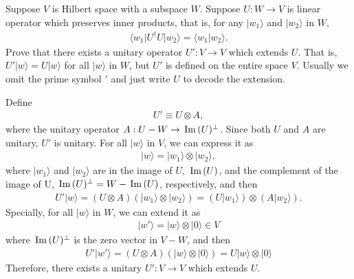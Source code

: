 \documentclass[en]{sol-man}
\begin{document}
\begin{exe}
    Suppose $V$ is Hilbert space with a subspace $W$. Suppose $U:W\rightarrow V$ is linear operator which preserves inner products, that is, for any $\lvert w_1\rangle$ and $\lvert w_2\rangle$ in $W$,
    \begin{align}
        \langle w_1\rvert U^{\dagger}U\lvert w_2\rangle=\langle w_1\vert w_2\rangle.
    \end{align}
    Prove that there exists a unitary operator $U':V\rightarrow V$ which extends $U$. That is, $U'\lvert w\rangle=U\lvert w\rangle$ for all $\lvert w\rangle$ in $W$, but $U'$ is defined on the entire space $V$. Usually we omit the prime symbol $'$ and just write $U$ to decode the extension.
\end{exe}
\begin{pf}
    Define
    \begin{align}
        U'\equiv U\otimes A,
    \end{align}
    where the unitary operator $A:U-W\rightarrow\,\mathrm{Im}\,(U)^{\perp}$.
    Since both $U$ and $A$ are unitary, $U'$ is unitary.
    For all $\lvert w\rangle$ in $V$, we can express it as
    \begin{align}
        \lvert w\rangle=\lvert w_1\rangle\otimes\lvert w_2\rangle,
    \end{align}
    where $\lvert w_1\rangle$ and $\lvert w_2\rangle$ are in the image of $U$, $\,\mathrm{Im}\,(U)$, and the complement of the image of U, $\,\mathrm{Im}\,(U)^{\perp}=W-\,\mathrm{Im}\,(U)$, respectively, and then
    \begin{align}
        U'\lvert w\rangle=(U\otimes A)(\lvert w_1\rangle\otimes\lvert w_2\rangle)=(U\lvert w_1\rangle)\otimes(A\lvert w_2\rangle).
    \end{align}
    Specially, for all $\lvert w\rangle$ in $W$, we can extend it as
    \begin{align}
        \lvert w'\rangle=\lvert w\rangle\otimes\lvert 0\rangle\in V
    \end{align}
    where $\,\mathrm{Im}\,(U)^{\perp}$ is the zero vector in $V-W$,
    and then
    \begin{align}
        U'\lvert w'\rangle=(U\otimes A)(\lvert w\rangle\otimes\lvert 0\rangle)=U\lvert w\rangle\otimes\lvert 0\rangle
    \end{align}
    Therefore, there exists a unitary $U':V\rightarrow V$ which extends $U$.
\end{pf}
\end{document}
